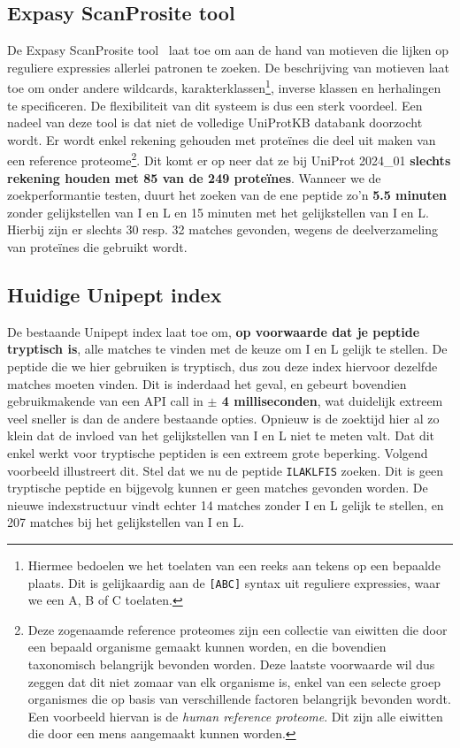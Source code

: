 \subsection{Expasy ScanProsite tool}
De Expasy ScanProsite tool~\cite{scanprosite} laat toe om aan de hand van motieven die lijken op reguliere expressies allerlei patronen te zoeken.
De beschrijving van motieven laat toe om onder andere wildcards, karakterklassen\footnote{Hiermee bedoelen we het toelaten van een reeks aan tekens op een bepaalde plaats. Dit is gelijkaardig aan de \texttt{[ABC]} syntax uit reguliere expressies, waar we een A, B of C toelaten.}, inverse klassen en herhalingen te specificeren.
De flexibiliteit van dit systeem is dus een sterk voordeel.
Een nadeel van deze tool is dat niet de volledige UniProtKB databank doorzocht wordt.
Er wordt enkel rekening gehouden met proteïnes die deel uit maken van een reference proteome\footnote{Deze zogenaamde reference proteomes zijn een collectie van eiwitten die door een bepaald organisme gemaakt kunnen worden, en die bovendien taxonomisch belangrijk bevonden worden. Deze laatste voorwaarde wil dus zeggen dat dit niet zomaar van elk organisme is, enkel van een selecte groep organismes die op basis van verschillende factoren belangrijk bevonden wordt. Een voorbeeld hiervan is de \textit{human reference proteome}. Dit zijn alle eiwitten die door een mens aangemaakt kunnen worden.}.
Dit komt er op neer dat ze bij UniProt 2024\_01 \textbf{slechts rekening houden met 85 van de 249 proteïnes}.
Wanneer we de zoekperformantie testen, duurt het zoeken van de ene peptide zo'n \textbf{5.5 minuten} zonder gelijkstellen van I en L en 15 minuten met het gelijkstellen van I en L\@.
Hierbij zijn er slechts 30 resp. 32 matches gevonden, wegens de deelverzameling van proteïnes die gebruikt wordt.

\subsection{Huidige Unipept index}
De bestaande Unipept index laat toe om, \textbf{op voorwaarde dat je peptide tryptisch is}, alle matches te vinden met de keuze om I en L gelijk te stellen.
De peptide die we hier gebruiken is tryptisch, dus zou deze index hiervoor dezelfde matches moeten vinden.
Dit is inderdaad het geval, en gebeurt bovendien gebruikmakende van een API call in \textbf{$\pm$ 4 milliseconden}, wat duidelijk extreem veel sneller is dan de andere bestaande opties.
Opnieuw is de zoektijd hier al zo klein dat de invloed van het gelijkstellen van I en L niet te meten valt.
Dat dit enkel werkt voor tryptische peptiden is een extreem grote beperking.
Volgend voorbeeld illustreert dit.
Stel dat we nu de peptide \texttt{ILAKLFIS} zoeken.
Dit is geen tryptische peptide en bijgevolg kunnen er geen matches gevonden worden.
De nieuwe indexstructuur vindt echter 14 matches zonder I en L gelijk te stellen, en 207 matches bij het gelijkstellen van I en L\@.

